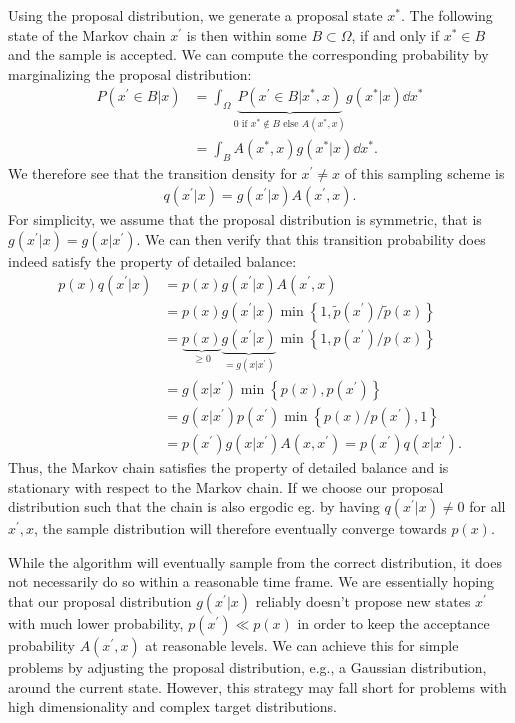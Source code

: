 Using the proposal distribution, we generate a proposal state $x^\ast$.
The following state of the Markov chain $x^\prime$ is then within some $B \subset \Omega$, if and only if $x^\ast \in B$ and the sample is accepted.
We can compute the corresponding probability by marginalizing the proposal distribution:
\begin{align}
        P(x^\prime \in B | x ) 
        &= \int_\Omega \underbrace{P( x^\prime \in B | x^\ast,x)}_{\text{$0$ if $x^\ast \not \in B$ else $A(x^\ast, x)$}} g(x^\ast|x) \dd{x^\ast}\\
        &= \int_B A(x^\ast, x) g(x^\ast|x) \dd{x^\ast}.
\end{align}
We therefore see that the transition density for $x^\prime \neq x$ of this sampling scheme is
\begin{align}
    q(x^\prime|x) = g(x^\prime | x) A(x^\prime, x).
\end{align} 
For simplicity, we assume that the proposal distribution is symmetric, that is $g(x^\prime | x) = g(x | x^\prime)$.
We can then verify that this transition probability does indeed satisfy the property of detailed balance:
\begin{align}
    p(x)q(x^\prime|x) &= p(x)g(x^\prime | x) A(x^\prime, x) \\
    &= p(x)g(x^\prime | x) \min\left\{1,  \tilde{p}(x^\prime) / \tilde{p}(x)\right\} \\
    &= \underbrace{p(x)}_{\geq 0} \underbrace{g(x^\prime | x)}_{=g(x | x^\prime)} \min\left\{1,  p(x^\prime) / p(x)\right\} \\
    &= g(x | x^\prime) \min\left\{p(x), p(x^\prime)\right\} \\
    &= g(x | x^\prime) p(x^\prime) \min\left\{p(x)/p(x^\prime), 1\right\} \\
    &= p(x^\prime) g(x | x^\prime)  A(x ,x^\prime) = p(x^\prime) q(x|x^\prime).
\end{align}
Thus, the Markov chain satisfies the property of detailed balance and is stationary with respect to the Markov chain.
If we choose our proposal distribution such that the chain is also ergodic eg. by having $q(x^\prime|x) \neq 0$ for all $x^\prime,x$, the sample distribution will therefore eventually converge towards $p(x)$. 

While the algorithm will eventually sample from the correct distribution, it does not necessarily do so within a reasonable time frame. 
We are essentially hoping that our proposal distribution $g(x^\prime | x)$ reliably doesn't propose new states $x^\prime$ with much lower probability, $p(x^\prime) \ll p(x) $ in order to keep the acceptance probability $A(x^\prime, x)$ at reasonable levels. 
We can achieve this for simple problems by adjusting the proposal distribution, e.g., a Gaussian distribution, around the current state.
However, this strategy may fall short for problems with high dimensionality and complex target distributions.

